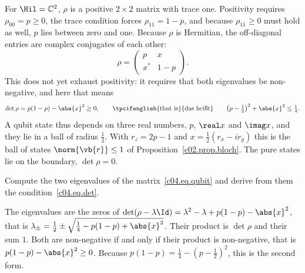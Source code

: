 \begin{example}\label{c04.ex.qubit-zustaende}
  For $\Hil = \mathbb{C}^2$, $\rho$ is a positive $2\times 2$ matrix with trace one. Positivity
  requires $\rho_{00} = p \geq 0$, the trace condition forces $\rho_{11} = 1-p$, and because
  $\rho_{11}\geq 0$ must hold as well, $p$ lies between zero and one. Because $\rho$ is Hermitian,
  the off-diagonal entries are complex conjugates of each other:
  \begin{equation}\label{c04.eq.qubit}
    \rho = \begin{pmatrix} p & x \\ x^* & 1-p \end{pmatrix} .
  \end{equation}
  This does not yet exhaust positivity: it requires that both eigenvalues be non-negative, and
  here that means
  \begin{equation}\label{c04.eq.det}
    \det\rho = p(1-p) - \abs{x}^2 \geq 0 ,
    \qquad \text{\tpcifenglish{that is}{das heißt}} \qquad
    \bigl(p - \tfrac12\bigr)^2 + \abs{x}^2 \leq \tfrac14 .
  \end{equation}
  A qubit state thus depends on three real numbers, $p$, $\real x$ and $\imag x$, and they lie in
  a ball of radius $\tfrac12$. With $r_z = 2p - 1$ and $x = \tfrac12(r_x - i r_y)$ this is the
  ball of states $\norm{\vb{r}} \leq 1$ of Proposition~\ref{c02.prop.bloch}. The pure states lie
  on the boundary, $\det\rho = 0$.
\end{example}

\begin{exercise}\label{c04.exc.eigenwerte}
  Compute the two eigenvalues of the matrix~\eqref{c04.eq.qubit} and derive from them the
  condition~\eqref{c04.eq.det}.
\end{exercise}
\begin{solution}
  The eigenvalues are the zeros of
  $\det(\rho - \lambda\Id) = \lambda^2 - \lambda + p(1-p) - \abs{x}^2$, that is
  $\lambda_\pm = \tfrac12 \pm \sqrt{\tfrac14 - p(1-p) + \abs{x}^2}$. Their product is $\det\rho$
  and their sum $1$. Both are non-negative if and only if their product is non-negative, that is
  $p(1-p) - \abs{x}^2 \geq 0$. Because $p(1-p) = \tfrac14 - (p - \tfrac12)^2$, this is the second
  form.
\end{solution}

